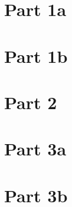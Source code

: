 \documentclass[11pt,a4paper]{article}
\begin{document}
\begin{titlepage}
    \maketitle
\end{titlepage}
\renewcommand{\contentsname}{Table of Contents}
\begin{center} 
    \tableofcontents 
    \listoffigures
\end{center}
\newpage

\section{Part 1a}

\section{Part 1b}

\section{Part 2}

\section{Part 3a}

\section{Part 3b}

\end{document}
